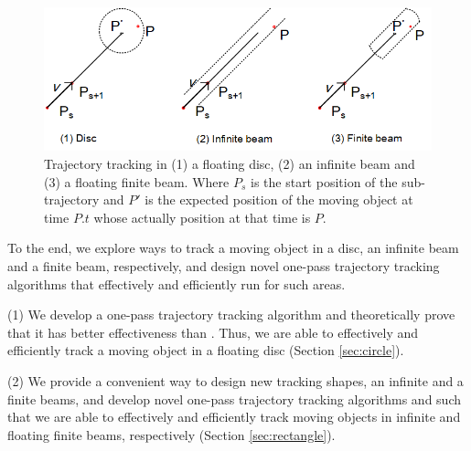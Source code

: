 \begin{figure}[tb!]
	\centering
	\includegraphics[scale=1.0]{Figures/Fig-Areas.png}\vspace{-1ex}
	\vspace{-1ex}
	\caption{\small Trajectory tracking in (1) a floating disc, (2) an infinite beam \cite{Chen:Space,Daescu:metric} and (3) a floating finite beam. Where $P_s$ is the start position of the sub-trajectory and $P'$ is the expected position of the moving object at time $P.t$ whose actually position at that time is $P$.}
	\vspace{-3ex}
	\label{fig:areas}
\end{figure}

To the end, we explore ways to track a moving object in a disc, an infinite beam and a finite beam, respectively, and design novel one-pass trajectory tracking algorithms that effectively and efficiently run for such areas. 

\ni (1) We develop a one-pass trajectory tracking algorithm \citt and theoretically prove that it has better effectiveness than \ldrh. Thus, we are able to effectively and efficiently track a moving object in a floating disc (Section \ref{sec:circle}).


\ni (2) We provide a convenient way to design new tracking shapes, \ie  an infinite and a finite beams, and develop novel one-pass trajectory tracking algorithms \sitt and \bitt such that we are able to effectively and efficiently track moving objects in infinite and floating finite beams, respectively (Section \ref{sec:rectangle}). 

